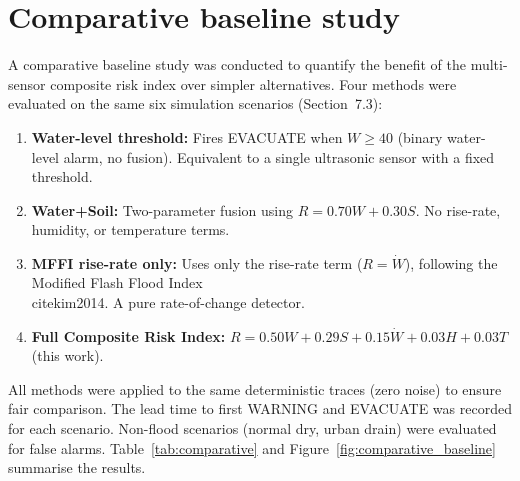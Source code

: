 \documentclass[5p,twocolumn]{elsarticle}
\begin{document}
\section{Comparative baseline study}

A comparative baseline study was conducted to quantify the benefit of the multi-sensor composite risk index over simpler alternatives. Four methods were evaluated on the same six simulation scenarios (Section~7.3):

\begin{enumerate}[nosep]
  \item \textbf{Water-level threshold:} Fires EVACUATE when $W \ge 40$ (binary water-level alarm, no fusion). Equivalent to a single ultrasonic sensor with a fixed threshold.
  \item \textbf{Water+Soil:} Two-parameter fusion using $R = 0.70W + 0.30S$. No rise-rate, humidity, or temperature terms.
  \item \textbf{MFFI rise-rate only:} Uses only the rise-rate term ($R = \dot{W}$), following the Modified Flash Flood Index \\cite{kim2014}. A pure rate-of-change detector.
  \item \textbf{Full Composite Risk Index:} $R = 0.50W + 0.29S + 0.15\dot{W} + 0.03H + 0.03T$ (this work).
\end{enumerate}

All methods were applied to the same deterministic traces (zero noise) to ensure fair comparison. The lead time to first WARNING and EVACUATE was recorded for each scenario. Non-flood scenarios (normal dry, urban drain) were evaluated for false alarms. Table~\ref{tab:comparative} and Figure~\ref{fig:comparative_baseline} summarise the results.
\end{document}
